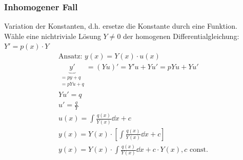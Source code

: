 \subsubsection{Inhomogener Fall}
Variation der Konstanten, d.h. ersetze die Konstante durch eine Funktion. \\
Wähle eine nichtriviale Lösung $Y \neq 0$ der homogenen Differentialgleichung: $Y' = p(x) \cdot Y$ \\
\begin{gather*}
	\text{Ansatz: } y(x) = Y(x) \cdot u(x) \\
	\underbrace{y'}_{\substack{=py+q\\=pYu+q}} = (Yu)' = Y'u + Yu' = pYu + Yu' \\
	Yu' = q \\
	u' = \frac{q}{Y} \\
	u(x) = \int \frac{q(x)}{Y(x)} \dd x + c \\
	y(x) = Y(x) \cdot \left[ \int \frac{q(x)}{Y(x)} \dd x + c \right] \\
	y(x) = Y(x) \cdot \int \frac{q(x)}{Y(x)} \dd x + c \cdot Y(x) , c \text{ const.}
\end{gather*}

